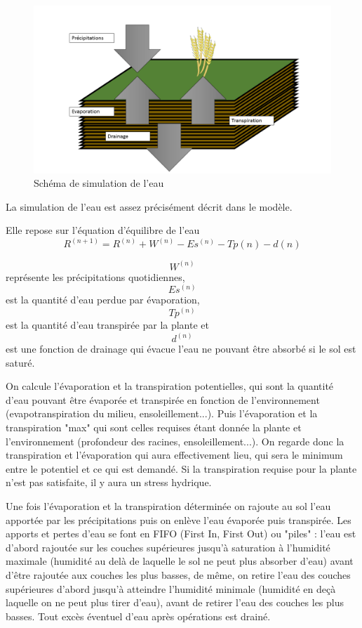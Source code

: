 \begin{figure}

\begin{center}
 \includegraphics[scale = 0.5]{./img/waterSchema.png}
 \caption{Schéma de simulation de l'eau}
 \label{fig:waterModel}
\end{center}

\end{figure}

La simulation de l'eau est assez précisément décrit dans le modèle. 

Elle repose sur l'équation d'équilibre de l'eau
\[ {R^{(n+1)}}=R^{(n)}+W^{(n)}-Es^{(n)}-Tp{(n)}-d{(n)}\]

\[W^{(n)}\] représente les précipitations quotidiennes,\[Es^{(n)}\] est la quantité d'eau perdue par évaporation, \[Tp^{(n)}\] est la quantité d'eau transpirée par la plante et \[d^{(n)}\] est une fonction de drainage qui évacue l'eau ne pouvant être absorbé si le sol est saturé. 

On calcule l'évaporation et la transpiration potentielles, qui sont la quantité d'eau pouvant être évaporée et transpirée en fonction de l'environnement (evapotranspiration du milieu, ensoleillement...). 
Puis l'évaporation et la transpiration "max" qui sont celles requises étant donnée la plante et l'environnement (profondeur des racines, ensoleillement...). 
On regarde donc la transpiration et l'évaporation qui aura effectivement lieu, qui sera le minimum entre le potentiel et ce qui est demandé.
Si la transpiration requise pour la plante n'est pas satisfaite, il y aura un stress hydrique. 

Une fois l'évaporation et la transpiration déterminée on rajoute au sol l'eau apportée par les précipitations puis on enlève l'eau évaporée puis transpirée. Les apports et pertes d'eau se font en FIFO (First In, First Out) ou "piles" : l'eau est d'abord rajoutée sur les couches supérieures jusqu'à saturation à l'humidité maximale (humidité au delà de laquelle le sol ne peut plus absorber d'eau) avant d'être rajoutée aux couches les plus basses, de même, on retire l'eau des couches supérieures d'abord jusqu'à atteindre l'humidité minimale (humidité en deçà laquelle on ne peut plus tirer d'eau), avant de retirer l'eau des couches les plus basses.
Tout excès éventuel d'eau après opérations est drainé.